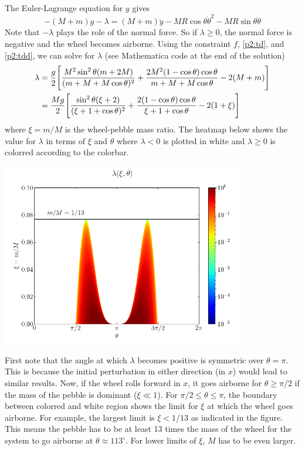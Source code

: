 \documentclass[12pt]{article}
\begin{document}
\begin{problem}{2}
\begin{solution}
    The Euler-Lagrange equation for $y$ gives
    \begin{equation}
        -(M+m)g-\lambda=(M+m)\ddot{y}-MR\cos\theta\dot\theta^2-MR\sin\theta\ddot\theta 
    \end{equation}
    Note that $-\lambda$ plays the role of the normal force. So if
    $\lambda\geq0$, the normal force is negative and the wheel becomes airborne.
    Using the constraint $f$, \eqref{p2:td}, and \eqref{p2:tdd}, we can solve
    for $\lambda$ (see Mathematica code at the end of the solution)
    \begin{align}
        \lambda&=\frac{g}{2}\qty[
            \frac{M^2\sin^2\theta(m+2M)}{(m+M+M\cos\theta)^2}
            +\frac{2M^2(1-\cos\theta)\cos\theta}{m+M+M\cos\theta}-2(M+m)
        ]\notag\\
       &=\frac{Mg}{2}\qty[
            \frac{\sin^2\theta(\xi+2)}{(\xi+1+\cos\theta)^2}
            +\frac{2(1-\cos\theta)\cos\theta}{\xi+1+\cos\theta}
            -2(1+\xi)
       ]
    \end{align}
    where $\xi=m/M$ is the wheel-pebble mass ratio. The heatmap below shows the
    value for $\lambda$ in terms of $\xi$ and $\theta$ where $\lambda<0$ is
    plotted in white and $\lambda\geq0$ is colorred according to the colorbar.
    \begin{center}
        \includegraphics[width=0.8\textwidth]{fig.png} 
    \end{center}

    First note that the angle at which $\lambda$ becomes positive is symmetric
    over $\theta=\pi$. This is because the initial perturbation in either
    direction (in $x$) would lead to similar results. Now, if the wheel rolls
    forward in $x$, it goes airborne for $\theta\geq\pi/2$ if the mass of the
    pebble is dominant ($\xi\ll1$). For $\pi/2\leq\theta\leq\pi$, the boundary
    between colorred and white region shows the limit for $\xi$ at which the
    wheel goes airborne. For example, the largest limit is $\xi<1/13$ as
    indicated in the figure. This means the pebble has to be at least 13 times 
    the mass of the wheel for the system to go airborne at
    $\theta\approx113^\circ$. For lower limits of $\xi$, $M$ has to be even
    larger.


\end{solution}
\end{problem}
\end{document}
